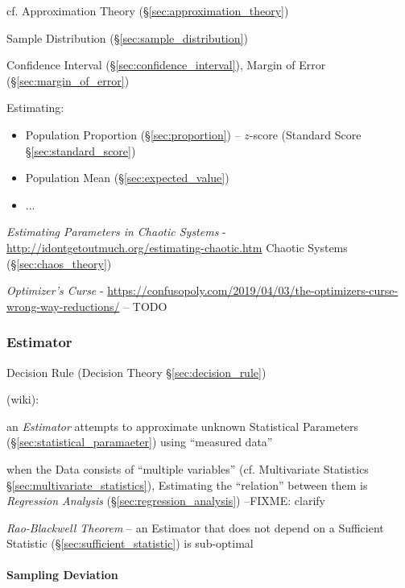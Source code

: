\fist cf. Approximation Theory (\S\ref{sec:approximation_theory})

Sample Distribution (\S\ref{sec:sample_distribution})

Confidence Interval (\S\ref{sec:confidence_interval}), Margin of Error
(\S\ref{sec:margin_of_error})

Estimating:
\begin{itemize}
  \item Population Proportion (\S\ref{sec:proportion}) -- $z$-score (Standard
    Score \S\ref{sec:standard_score})
  \item Population Mean (\S\ref{sec:expected_value})
  \item ...
\end{itemize}

\emph{Estimating Parameters in Chaotic Systems} -
\url{http://idontgetoutmuch.org/estimating-chaotic.htm} \fist Chaotic Systems
(\S\ref{sec:chaos_theory})

\asterism

\emph{Optimizer's Curse} -
\url{https://confusopoly.com/2019/04/03/the-optimizers-curse-wrong-way-reductions/}
-- TODO



\subsubsection{Estimator}\label{sec:estimator}

\fist Decision Rule (Decision Theory \S\ref{sec:decision_rule})

(wiki):

an \emph{Estimator} attempts to approximate unknown Statistical Parameters
(\S\ref{sec:statistical_paramaeter}) using ``measured data''

when the Data consists of ``multiple variables'' (cf. Multivariate Statistics
\S\ref{sec:multivariate_statistics}), Estimating the ``relation'' between them
is \emph{Regression Analysis} (\S\ref{sec:regression_analysis})
--FIXME: clarify

\emph{Rao-Blackwell Theorem} -- an Estimator that does not depend on a
Sufficient Statistic (\S\ref{sec:sufficient_statistic}) is sub-optimal



\paragraph{Sampling Deviation}\label{sec:sampling_deviation}\hfill

